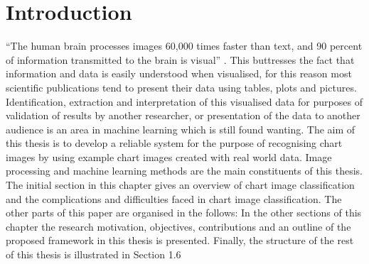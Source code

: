 \documentclass[12pt, a4paper,oneside]{report}
\begin{document}

\setcounter{tocdepth}{10}

\clearpage
\tableofcontents





\listoffigures
\listoftables

\titleformat{\chapter}{\LARGE\bfseries}{\thechapter}{1em}{}

\newpage


\newpage
\chapter{Introduction}
``The human brain processes images 60,000 times faster than text, and 90 percent of information transmitted to the brain is visual'' \cite{humaneye}. This buttresses the fact that information and data is easily understood when visualised, for this reason most scientific publications tend to present their data using tables, plots and pictures. Identification, extraction and interpretation of this visualised data for purposes of validation of results by another researcher, or presentation of the data to another audience is an area in machine learning which is still found wanting.\newline\newline
The aim of this thesis is to develop a reliable system for the purpose of recognising chart images by using example chart images created with real world data. Image processing and machine learning methods are the main constituents of this thesis. The initial section in this chapter gives an overview of chart image classification and the complications and difficulties faced in chart image classification.  The other parts of this paper are organised in the follows: 
In the other sections of this chapter the research motivation, objectives, contributions and an outline of
the proposed framework in this thesis is presented. Finally, the structure of the rest of this thesis is illustrated in Section 1.6
\end{document}
